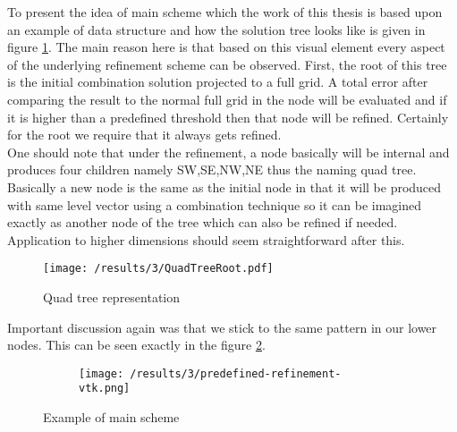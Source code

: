  To present the idea of main scheme which the work of this thesis is based upon an example of data structure and how the solution tree looks like is given in figure \ref{fig:QuadTreeRoot1}. The main reason here is that based on this visual element every aspect of the underlying refinement scheme can be observed. First, the root of this tree is the initial combination solution projected to a full grid. A total error after comparing the result to the normal full grid in the node will be evaluated and if it is higher than a predefined threshold then that node will be refined. Certainly for the root we require that it always gets refined. \\
 One should note that under the refinement, a node basically will be internal and produces four children namely SW,SE,NW,NE thus the naming quad tree. Basically a new node is the same as the initial node in that it will be produced with same level vector using a combination technique so it can be imagined exactly as another node of the tree which can also be refined if needed. Application to higher dimensions should seem straightforward after this.\\
 
 \begin{figure}[h]
	\centering
	    \texttt{[image: /results/3/QuadTreeRoot.pdf]}
		\centering
        \caption{Quad tree representation}
        \label{fig:QuadTreeRoot1}
\end{figure}

 Important discussion again was that we stick to the same pattern in our lower nodes. This can be seen exactly in the figure \ref{fig:Predef2}.
 
\begin{figure}[h]
	\centering

    \begin{subfigure}{0.5\textwidth}
	    \texttt{[image: /results/3/predefined-refinement-vtk.png]}
		\centering
    \end{subfigure} 
    \caption{Example of main scheme}
    \label{fig:Predef2}
\end{figure}
 



